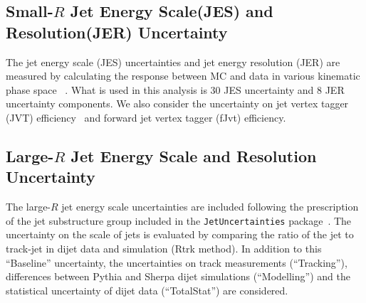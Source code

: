 \subsection*{Small-$R$ Jet Energy Scale(JES) and Resolution(JER) Uncertainty}
The jet energy scale (JES) uncertainties and jet energy resolution (JER) are measured by calculating the response between MC and data in various kinematic phase space ~\cite{JetUncertainties}.
What is used in this analysis is 30 JES uncertainty and 8 JER uncertainty components.
We also consider the uncertainty on jet vertex tagger (JVT) efficiency~\cite{JVTCalib} and forward jet vertex tagger (fJvt) efficiency.



\subsection*{Large-$R$ Jet Energy Scale and Resolution Uncertainty}
\label{sec:fatjetUncert}

The large-$R$ jet energy scale uncertainties are included following the prescription of the
jet substructure group included in the \texttt{JetUncertainties} package~\cite{JSSrecommendation}.
The uncertainty on the \pt scale of jets is evaluated by
comparing the ratio of the jet \pt to track-jet \pt in dijet data and simulation (Rtrk method).
In addition to this ``Baseline'' uncertainty, the uncertainties on track measurements (``Tracking''), differences between Pythia and Sherpa dijet simulations (``Modelling'') and the statistical uncertainty of dijet data (``TotalStat'') are considered.

